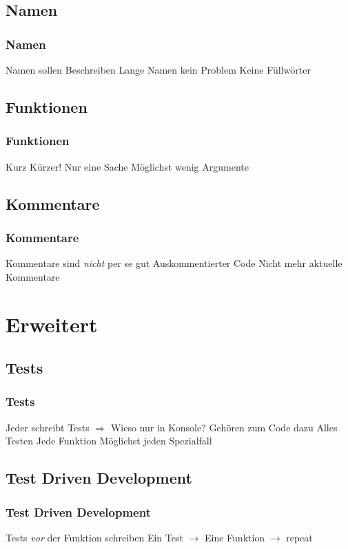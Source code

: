 \documentclass[handout]{beamer}
\begin{document}
\subsection{Namen}
\begin{frame}
    \frametitle{Namen}
    \begin{outline}
        \1 Namen sollen Beschreiben
        \1 Lange Namen kein Problem
        \1 Keine Füllwörter
    \end{outline}
\end{frame}

\subsection{Funktionen}
\begin{frame}
    \frametitle{Funktionen}
    \begin{outline}
        \1 Kurz
        \1 Kürzer!
        \1 Nur eine Sache
        \1 Möglichst wenig Argumente
    \end{outline}
\end{frame}

\subsection{Kommentare}
\begin{frame}
    \frametitle{Kommentare}
    \begin{outline}
        \1 Kommentare sind \emph{nicht} per se gut
        \1 Auskommentierter Code
        \1 Nicht mehr aktuelle Kommentare
    \end{outline}
\end{frame}

\section{Erweitert}
\subsection{Tests}
\begin{frame}
    \frametitle{Tests}
    \begin{outline}
        \1 Jeder schreibt Tests 
        \1[] $\Rightarrow$  Wieso nur in Konsole?
        \1 Gehören zum Code dazu
        \1 Alles Testen
            \2 Jede Funktion
            \2 Möglichst jeden Spezialfall
    \end{outline}
\end{frame}
\subsection{Test Driven Development}
\begin{frame}
    \frametitle{Test Driven Development}
    \begin{outline}
        \1 Tests \emph{vor} der Funktion schreiben
        \1 Ein Test $\rightarrow$ Eine Funktion $\rightarrow$ repeat
    \end{outline}
\end{frame}
\end{document}
